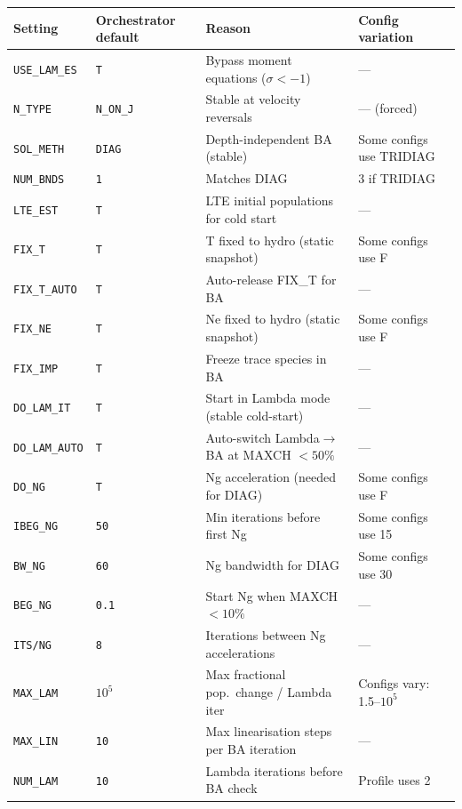 \documentclass[11pt]{article}
\begin{document}
\begin{center}
\begin{tabular}{llll}
\toprule
Setting & Orchestrator default & Reason & Config variation \\
\midrule
\texttt{USE\_LAM\_ES}  & \texttt{T}  & Bypass moment equations ($\sigma<-1$) & --- \\
\texttt{N\_TYPE}       & \texttt{N\_ON\_J} & Stable at velocity reversals & --- (forced) \\
\texttt{SOL\_METH}     & \texttt{DIAG} & Depth-independent BA (stable) & Some configs use TRIDIAG \\
\texttt{NUM\_BNDS}     & \texttt{1}  & Matches DIAG & 3 if TRIDIAG \\
\texttt{LTE\_EST}      & \texttt{T}  & LTE initial populations for cold start & --- \\
\texttt{FIX\_T}        & \texttt{T}  & T fixed to hydro (static snapshot) & Some configs use F \\
\texttt{FIX\_T\_AUTO}  & \texttt{T}  & Auto-release FIX\_T for BA & --- \\
\texttt{FIX\_NE}       & \texttt{T}  & Ne fixed to hydro (static snapshot) & Some configs use F \\
\texttt{FIX\_IMP}      & \texttt{T}  & Freeze trace species in BA & --- \\
\texttt{DO\_LAM\_IT}   & \texttt{T}  & Start in Lambda mode (stable cold-start) & --- \\
\texttt{DO\_LAM\_AUTO} & \texttt{T}  & Auto-switch Lambda$\to$BA at MAXCH $< 50\%$ & --- \\
\texttt{DO\_NG}        & \texttt{T}  & Ng acceleration (needed for DIAG) & Some configs use F \\
\texttt{IBEG\_NG}      & \texttt{50} & Min iterations before first Ng & Some configs use 15 \\
\texttt{BW\_NG}        & \texttt{60} & Ng bandwidth for DIAG & Some configs use 30 \\
\texttt{BEG\_NG}       & \texttt{0.1} & Start Ng when MAXCH $< 10\%$ & --- \\
\texttt{ITS/NG}        & \texttt{8}  & Iterations between Ng accelerations & --- \\
\texttt{MAX\_LAM}      & \texttt{$10^{5}$} & Max fractional pop.\ change / Lambda iter & Configs vary: 1.5--$10^{5}$ \\
\texttt{MAX\_LIN}      & \texttt{10} & Max linearisation steps per BA iteration & --- \\
\texttt{NUM\_LAM}      & \texttt{10} & Lambda iterations before BA check & Profile uses 2 \\

\end{tabular}
\end{center}
\end{document}

